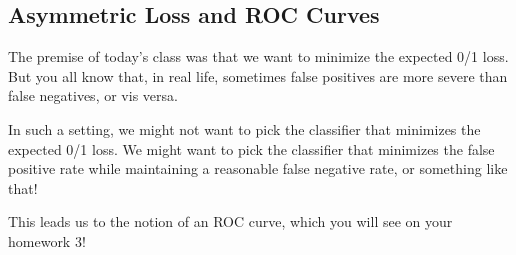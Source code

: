 \subsection{Asymmetric Loss and ROC Curves}

The premise of today's class was that we want to minimize the expected 0/1 loss. But you all know that, in real life, sometimes false positives are more severe than false negatives, or vis versa. 

In such a setting, we might not want to pick the classifier that minimizes the expected 0/1 loss. We might want to pick the classifier that minimizes the false positive rate while maintaining a reasonable false negative rate, or something like that!

This leads us to the notion of an ROC curve, which you will see on your homework 3! 



